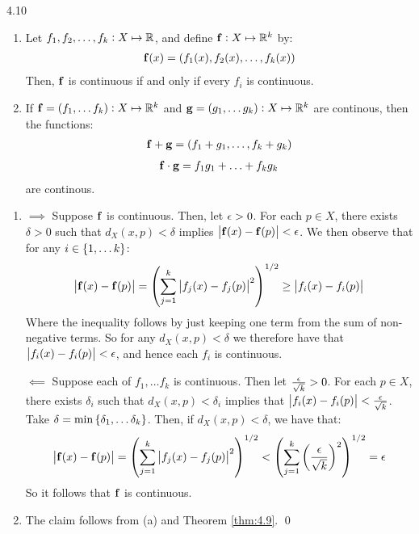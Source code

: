 \begin{theorem}{}{4.10}
    \begin{enumerate}
        \item Let $f_1, f_2, \ldots, f_k: X \mapsto \mathbb{R}$, and define $\mathbf{f}: X \mapsto \mathbb{R}^k$ by:
        \begin{align*}
            \mathbf{f}(x) = (f_1(x), f_2(x), \ldots, f_k(x))
        \end{align*}
        Then, $\mathbf{f}$ is continuous if and only if every $f_i$ is continuous.
        \item If $\mathbf{f} = (f_1, \ldots f_k): X \mapsto \mathbb{R}^k$ and $\mathbf{g} = (g_1, \ldots g_k): X \mapsto \mathbb{R}^k$ are continous, then the functions:
        \begin{align*}
            \mathbf{f} + \mathbf{g} = (f_1 + g_1, \ldots, f_k + g_k)
        \end{align*}
        \begin{align*}
            \mathbf{f} \cdot \mathbf{g} = f_1g_1 + \ldots + f_kg_k
        \end{align*}
        are continous.
    \end{enumerate} 
\end{theorem}
\begin{nproof}
    \begin{enumerate}
        \item $\boxed{\implies}$ Suppose $\mathbf{f}$ is continuous. Then, let $\epsilon > 0$. For each $p \in X$, there exists $\delta > 0$ such that $d_X(x, p) < \delta$ implies $\abs{\mathbf{f}(x) - \mathbf{f}(p)} < \epsilon$. We then observe that for any $i \in \set{1, \ldots k}$:
        \begin{align*}
            \abs{\mathbf{f}(x) - \mathbf{f}(p)} = \left(\sum_{j=1}^k \abs{f_j(x) - f_j(p)}^2\right)^{1/2} \geq \abs{f_i(x) - f_i(p)}
        \end{align*}
        Where the inequality follows by just keeping one term from the sum of non-negative terms. So for any $d_X(x, p) < \delta$ we therefore have that $\abs{f_i(x) - f_i(p)} < \epsilon$, and hence each $f_i$ is continuous.
        
        $\boxed{\impliedby}$ Suppose each of $f_1, \ldots f_k$ is continuous. Then let $\frac{\epsilon}{\sqrt{k}} > 0$. For each $p \in X$, there exists $\delta_i$ such that $d_X(x, p) < \delta_i$ implies that $\abs{f_i(x) - f_i(p)} < \frac{\epsilon}{\sqrt{k}}$. Take $\delta = \min\set{\delta_1, \ldots \delta_k}$. Then, if $d_X(x, p) < \delta$, we have that:
        \begin{align*}
            \abs{\mathbf{f}(x) - \mathbf{f}(p)} = \left(\sum_{j=1}^k \abs{f_j(x) - f_j(p)}^2\right)^{1/2} < \left(\sum_{j=1}^k \left(\frac{\epsilon}{\sqrt{k}}\right)^2\right)^{1/2} = \epsilon
        \end{align*}
        So it follows that $\mathbf{f}$ is continuous.
        \item The claim follows from (a) and Theorem \ref{thm:4.9}. \qed
    \end{enumerate}
\end{nproof}

